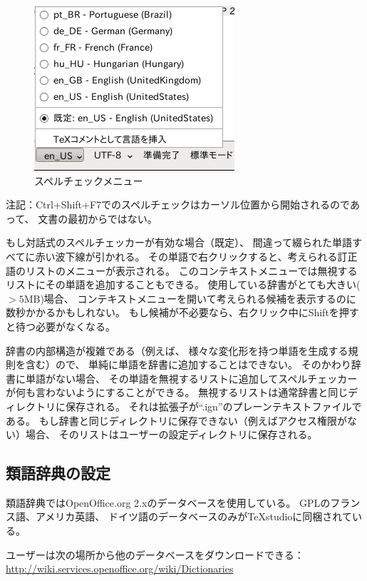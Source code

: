 \begin{figure}[H]
  \centering
  \includegraphics{spellcheck_menu.png}
  \caption{スペルチェックメニュー}
\end{figure}

注記：Ctrl+Shift+F7でのスペルチェックはカーソル位置から開始されるのであって、
文書の最初からではない。


もし対話式のスペルチェッカーが有効な場合（既定）、
間違って綴られた単語すべてに赤い波下線が引かれる。
その単語で右クリックすると、考えられる訂正語のリストのメニューが表示される。
このコンテキストメニューでは無視するリストにその単語を追加することもできる。
使用している辞書がとても大きい(${}>5\mathrm{MB}$)場合、
コンテキストメニューを開いて考えられる候補を表示するのに数秒かかるかもしれない。
もし候補が不必要なら、右クリック中にShiftを押すと待つ必要がなくなる。


辞書の内部構造が複雑である（例えば、
様々な変化形を持つ単語を生成する規則を含む）ので、
単純に単語を辞書に追加することはできない。
そのかわり辞書に単語がない場合、
その単語を無視するリストに追加してスペルチェッカーが何も言わないようにすることができる。
無視するリストは通常辞書と同じディレクトリに保存される。
それは拡張子が``.ign''のプレーンテキストファイルである。
もし辞書と同じディレクトリに保存できない（例えばアクセス権限がない）場合、
そのリストはユーザーの設定ディレクトリに保存される。

\subsection{類語辞典の設定}

類語辞典ではOpenOffice.org 2.xのデータベースを使用している。
GPLのフランス語、アメリカ英語、
ドイツ語のデータベースのみがTeXstudioに同梱されている。

ユーザーは次の場所から他のデータベースをダウンロードできる：
\href{http://wiki.services.openoffice.org/wiki/Dictionaries}{http://wiki.services.openoffice.org/wiki/Dictionaries}

